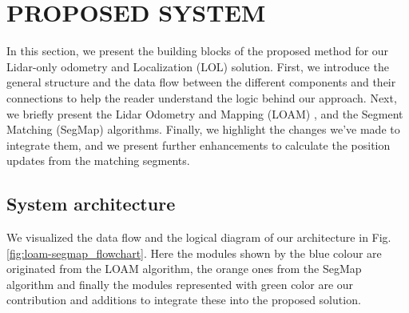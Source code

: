 \documentclass[letterpaper, 10 pt, conference]{ieeeconf}  %
\begin{document}
\section{PROPOSED SYSTEM} \label{proposed_system}
In this section, we present the building blocks of the proposed method for our Lidar-only odometry and Localization (LOL) solution. First, we introduce the general structure and the data flow between the different components and their connections to help the reader understand the logic behind our approach.
Next, we briefly present the Lidar Odometry and Mapping (LOAM) \cite{loam}, and the Segment Matching (SegMap) \cite{segmap} algorithms.
Finally, we highlight the changes we've made to integrate them, and we present further enhancements to calculate the position updates from the matching segments.  


\subsection{System architecture} \label{system_architecture}
We visualized the data flow and the logical diagram of our architecture in Fig. \ref{fig:loam-segmap_flowchart}. Here the modules shown by the blue colour are originated from the LOAM algorithm, the orange ones from the SegMap algorithm and finally the modules represented with green color are our contribution and additions to integrate these into the proposed solution. 
\end{document}
